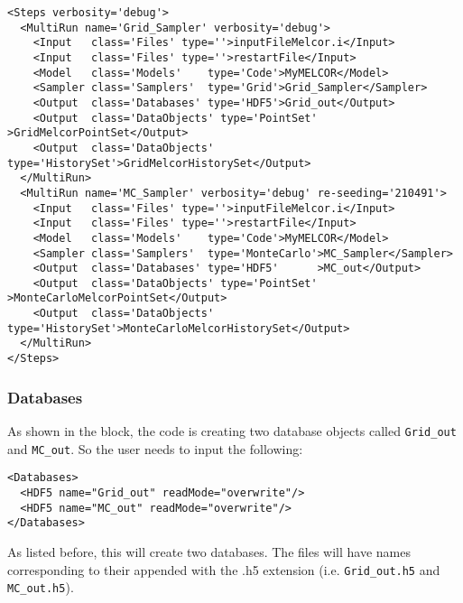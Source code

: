 \begin{lstlisting}[style=XML]
<Steps verbosity='debug'>
  <MultiRun name='Grid_Sampler' verbosity='debug'>
    <Input   class='Files' type=''>inputFileMelcor.i</Input>
    <Input   class='Files' type=''>restartFile</Input>
    <Model   class='Models'    type='Code'>MyMELCOR</Model>
    <Sampler class='Samplers'  type='Grid'>Grid_Sampler</Sampler>
    <Output  class='Databases' type='HDF5'>Grid_out</Output>
    <Output  class='DataObjects' type='PointSet'   >GridMelcorPointSet</Output>
    <Output  class='DataObjects' type='HistorySet'>GridMelcorHistorySet</Output>
  </MultiRun>
  <MultiRun name='MC_Sampler' verbosity='debug' re-seeding='210491'>
    <Input   class='Files' type=''>inputFileMelcor.i</Input>
    <Input   class='Files' type=''>restartFile</Input>
    <Model   class='Models'    type='Code'>MyMELCOR</Model>
    <Sampler class='Samplers'  type='MonteCarlo'>MC_Sampler</Sampler>
    <Output  class='Databases' type='HDF5'      >MC_out</Output>
    <Output  class='DataObjects' type='PointSet'   >MonteCarloMelcorPointSet</Output>
    <Output  class='DataObjects' type='HistorySet'>MonteCarloMelcorHistorySet</Output>
  </MultiRun>
</Steps>
\end{lstlisting}
\subsubsection{Databases}
As shown in the  block, the code is creating two database objects
called \texttt{Grid\_out} and \texttt{MC\_out}.
%
So the user needs to input the following:
\begin{lstlisting}[style=XML]
<Databases>
  <HDF5 name="Grid_out" readMode="overwrite"/>
  <HDF5 name="MC_out" readMode="overwrite"/>
</Databases>
\end{lstlisting}
As listed before, this will create two databases.
%
The files will have names corresponding to their  appended with
the .h5 extension (i.e. \texttt{Grid\_out.h5} and \texttt{MC\_out.h5}).
